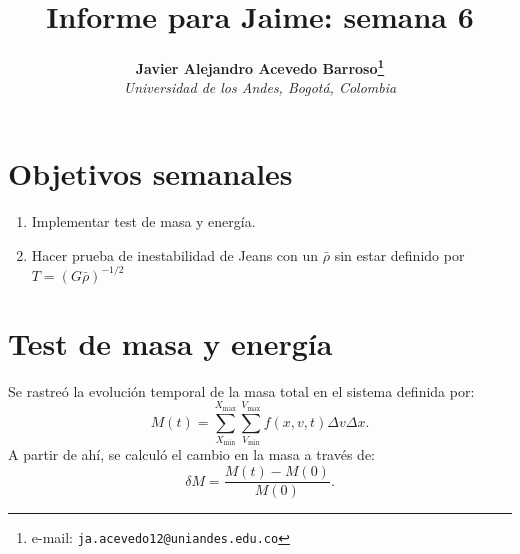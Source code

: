 \documentclass[notitlepage,letterpaper,12pt]{article} %
\begin{document}
\title{Informe para Jaime: semana 6}
\author{
\textbf{Javier Alejandro Acevedo Barroso\thanks{e-mail: \texttt{ja.acevedo12@uniandes.edu.co}}}\\
\textit{Universidad de los Andes, Bogotá, Colombia}\\
} %

\maketitle %






 

\section{Objetivos semanales}
\begin{enumerate}
\item Implementar test de masa y energía.
\item Hacer prueba de inestabilidad de Jeans con un $\bar{\rho}$ sin estar definido por $T = (G \bar{\rho})^{-1/2}$


\end{enumerate}

\section{Test de masa y energía}
Se rastreó la evolución temporal de la masa total en el sistema definida por:
\begin{equation}
M(t) = \sum_{X_\text{min}}^{X_\text{max}} \sum_{V_\text{min}}^{V_\text{max}} f(x,v,t) \Delta v \Delta x.
\end{equation}
A partir de ahí, se calculó el cambio en la masa a través de: 
\begin{equation}
\delta M = \frac{M(t) - M(0)}{M(0)}.
\end{equation}
\end{document}
